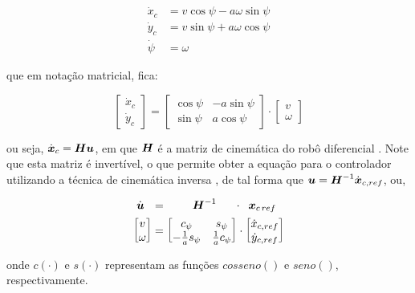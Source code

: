     \begin{align}
        \dot{x}_c &= v\cos{\psi} - a\omega\sin{\psi}   \\
        \dot{y}_c &= v\sin{\psi} + a\omega\cos{\psi}    \\
        \dot{\psi} &= \omega
    \end{align}

    que em notação matricial, fica:

    \begin{equation}
        \begin{bmatrix} \dot{x}_c \\ \dot{y}_c  \end{bmatrix} = \begin{bmatrix} \cos{\psi} & -a \sin{\psi} \\ \sin{\psi} & a \cos{\psi}   \end{bmatrix} \cdot \begin{bmatrix} v \\ \omega    \end{bmatrix}
        \label{eq:kinematics_differential}
    \end{equation}
    
    ou seja, \( \dot{\boldsymbol{x}}_c = \boldsymbol{H} \boldsymbol{u} \), em que $\boldsymbol{H}$ é a matriz de cinemática do robô diferencial \cite{Sarcinelli-Filho2023_2}. Note que esta matriz é invertível, o que permite obter a equação para o controlador utilizando a técnica de cinemática inversa \cite{Sarcinelli-Filho2023_4}, de tal forma que $\boldsymbol{u} = \boldsymbol{H}^{-1} \dot{\boldsymbol{x}}_{c,ref}$, ou, 
    
    \begin{align}
        \label{eq:kinematic_controller_differential}
        \dot{\boldsymbol{u}} \ \  & = \qquad \;  \boldsymbol{H}^{-1} \quad\;\; \cdot \; \; \boldsymbol{x}_{c\,ref}    \notag \\
        \begin{bmatrix} v \\ \omega    \end{bmatrix} & =  \begin{bmatrix} c_\psi & s_\psi \\ -\frac{1}{a}s_\psi & \frac{1}{a} c_\psi   \end{bmatrix} \cdot \begin{bmatrix}\dot{x}_{c,ref} \\ \dot{y}_{c,ref}   \end{bmatrix}
    \end{align}
    
   onde $ c(\cdot) $ e $ s(\cdot) $ representam as funções $ cosseno() $ e $ seno() $, respectivamente.
    
